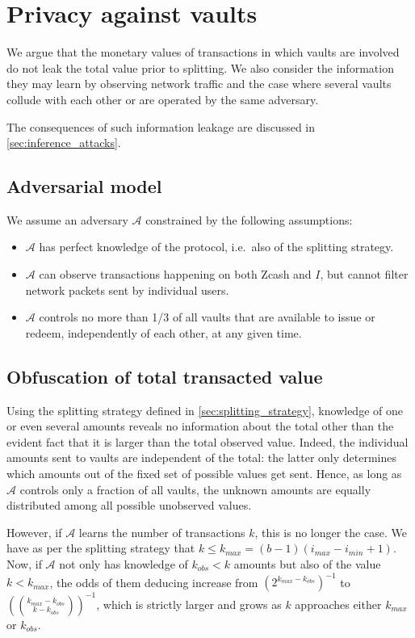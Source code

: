 \section{Privacy against vaults}
\label{sec:privacy}

We argue that the monetary values of transactions in which vaults are involved do not leak the total value prior to splitting.
We also consider the information they may learn by observing network traffic and the case where several vaults collude with each other or are operated by the same adversary.

The consequences of such information leakage are discussed in \cref{sec:inference_attacks}.

\subsection{Adversarial model}

We assume an adversary $\mathcal{A}$ constrained by the following assumptions:
\begin{itemize}
    \item $\mathcal{A}$ has perfect knowledge of the \zclaim protocol, i.e.\ also of the splitting strategy.
    \item $\mathcal{A}$ can observe transactions happening on both Zcash and $I$, but cannot filter network packets sent by individual users.
    \item $\mathcal{A}$ controls no more than 1/3 of all vaults that are available to issue or redeem, independently of each other, at any given time.
\end{itemize}

\subsection{Obfuscation of total transacted value}

Using the splitting strategy defined in \cref{sec:splitting_strategy}, knowledge of one or even several amounts reveals no information about the total \vtot other than the evident fact that it is larger than the total observed value.
Indeed, the individual amounts sent to vaults are independent of the total: the latter only determines which amounts out of the fixed set of possible values get sent.
Hence, as long as $\mathcal{A}$ controls only a fraction of all vaults, the unknown amounts are equally distributed among all possible unobserved values.

However, if $\mathcal{A}$ learns the number of transactions $k$, this is no longer the case.
We have as per the splitting strategy that $k \leq k_{max} = (b-1) (i_{max}-i_{min} + 1)$.
Now, if $\mathcal{A}$ not only has knowledge of $k_{obs}<k$ amounts but also of the value $k<k_{max}$, the odds of them deducing \vtot increase from $(2^{k_{max}-k_{obs}})^{-1}$ to $\left(\binom{k_{max}-k_{obs}}{k-k_{obs}}\right)^{-1}$, which is strictly larger and grows as $k$ approaches either $k_{max}$ or $k_{obs}$.

